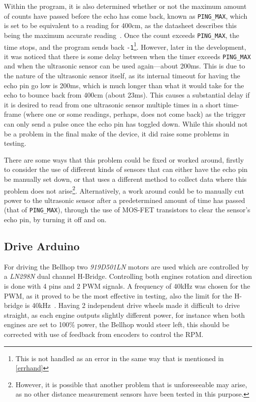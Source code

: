 \documentclass[11pt]{article}
\begin{document}
Within the program, it is also determined whether or not the maximum amount of counts have passed before the echo has come back, known as \texttt{PING\_MAX}, which is set to be equivalent to a reading for 400cm, as the datasheet describes this being the maximum accurate reading~\cite{ping-datasheet}. Once the count exceeds \texttt{PING\_MAX}, the time stops, and the program sends back \texttt{-1}\footnote{This is not handled as an error in the same way that is mentioned in \ref{errhand}}. However, later in the development, it was noticed that there is some delay between when the timer exceeds \texttt{PING\_MAX} and when the ultrasonic sensor can be used again---about 200ms. This is due to the nature of the ultrasonic sensor itself, as its internal timeout for having the echo pin go low is 200ms, which is much longer than what it would take for the echo to bounce back from 400cm (about 23ms). This causes a substantial delay if it is desired to read from one ultrasonic sensor multiple times in a short time-frame (where one or some readings, perhaps, does not come back) as the trigger can only send a pulse once the echo pin has toggled down. While this should not be a problem in the final make of the device, it did raise some problems in testing.


There are some ways that this problem could be fixed or worked around, firstly to consider the use of different kinds of sensors that can either have the echo pin be manually set down, or that uses a different method to collect data where this problem does not arise\footnote{However, it is possible that another problem that is unforeseeable may arise, as no other distance measurement sensors have been tested in this purpose.}. Alternatively, a work around could be to manually cut power to the ultrasonic sensor after a predetermined amount of time has passed (that of \texttt{PING\_MAX}), through the use of MOS-FET transistors to clear the sensor's echo pin, by turning it off and on.


\subsection*{Drive Arduino}
For driving the Bellhop two \textit{919D501LN} motors are used which are controlled by a \textit{LN298N} dual channel H-Bridge. Controlling both engines rotation and direction is done with 4 pins and 2 PWM signals. A frequency of 40kHz was chosen for the PWM, as it proved to be the most effective in testing, also the limit for the H-bridge is 40kHz~\cite{hbridge-datasheet}. Having 2 independent drive wheels made it difficult to drive straight, as each engine outputs slightly different power, for instance when both engines are set to 100\% power, the Bellhop would steer left, this should be corrected with use of feedback from encoders to control the RPM.
\end{document}
